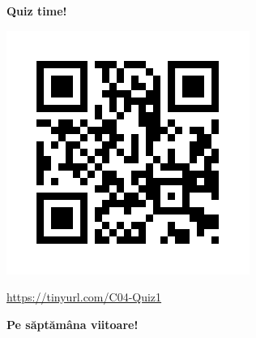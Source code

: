 \documentclass[xcolor=pdftex,romanian,colorlinks]{beamer}
\begin{document}
\begin{frame}
  \vfill
  \centering

\textbf{\large \alert{Quiz time!}}

\includegraphics[scale=.35]{../Quiz/C04-Q1.png}

 \url{https://tinyurl.com/C04-Quiz1}
  \vfill
\end{frame}

\begin{frame}
  \vfill
  \centering

\textbf{Pe săptămâna viitoare!}

  \vfill
\end{frame}
\end{document}
